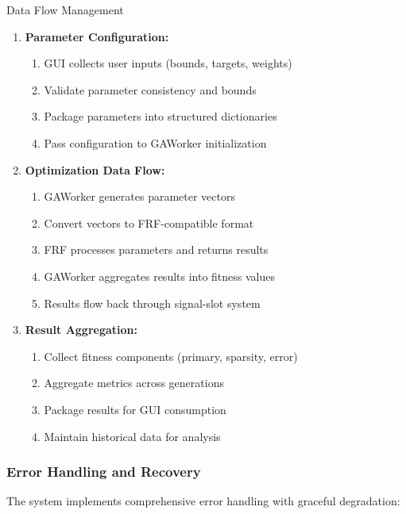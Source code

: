 \documentclass[12pt,a4paper]{article}
\begin{document}
\begin{algorithm}
\caption{Data Flow Management}
\begin{enumerate}
    \item \textbf{Parameter Configuration:}
    \begin{enumerate}
        \item GUI collects user inputs (bounds, targets, weights)
        \item Validate parameter consistency and bounds
        \item Package parameters into structured dictionaries
        \item Pass configuration to GAWorker initialization
    \end{enumerate}
    \item \textbf{Optimization Data Flow:}
    \begin{enumerate}
        \item GAWorker generates parameter vectors
        \item Convert vectors to FRF-compatible format
        \item FRF processes parameters and returns results
        \item GAWorker aggregates results into fitness values
        \item Results flow back through signal-slot system
    \end{enumerate}
    \item \textbf{Result Aggregation:}
    \begin{enumerate}
        \item Collect fitness components (primary, sparsity, error)
        \item Aggregate metrics across generations
        \item Package results for GUI consumption
        \item Maintain historical data for analysis
    \end{enumerate}
\end{enumerate}
\end{algorithm}

\subsubsection{Error Handling and Recovery}

The system implements comprehensive error handling with graceful degradation:
\end{document}

